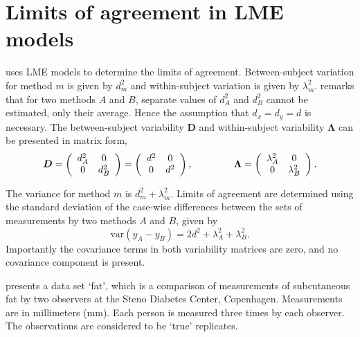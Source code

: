 \documentclass[12pt, a4paper]{report}
\theoremstyle{plain}
\theoremstyle{definition}
\theoremstyle{remark}
\begin{document}

\section{Limits of agreement in LME models}

\citet{BXC2008} uses LME models to determine the limits of agreement. Between-subject variation for method $m$ is given by $d^2_{m}$ and within-subject variation is given by $\lambda^2_{m}$.  \citet{BXC2008} remarks that for two methods $A$ and $B$, separate values of $d^2_{A}$ and $d^2_{B}$ cannot be estimated, only their average. Hence the assumption that $d_{x}= d_{y}= d$ is necessary. The between-subject variability $\boldsymbol{D}$ and within-subject variability $\boldsymbol{\Lambda}$ can be presented in matrix form,\[
\boldsymbol{D} = \left(%
\begin{array}{cc}
d^2_{A}& 0 \\
0 & d^2_{B} \\
\end{array}%
\right)=\left(%
\begin{array}{cc}
d^2& 0 \\
0 & d^2\\
\end{array}%
\right),
\hspace{1.5cm}
\boldsymbol{\Lambda} = \left(%
\begin{array}{cc}
\lambda^2_{A}& 0 \\
0 & \lambda^2_{B} \\
\end{array}%
\right).
\]

The variance for method $m$ is $d^2_{m}+\lambda^2_{m}$. Limits of agreement are determined using the standard deviation of the case-wise differences between the sets of measurements by two methods $A$ and $B$, given by
\begin{equation}
\mbox{var} (y_{A}-y_{B}) = 2d^2 + \lambda^2_{A}+ \lambda^2_{B}.
\end{equation}
Importantly the covariance terms in both variability matrices are zero, and no covariance component is present.

\citet{BXC2008} presents a data set `fat', which is a comparison of measurements of subcutaneous fat
by two observers at the Steno Diabetes Center, Copenhagen. Measurements are in millimeters
(mm). Each person is measured three times by each observer. The observations are considered to be `true' replicates.
\end{document}
